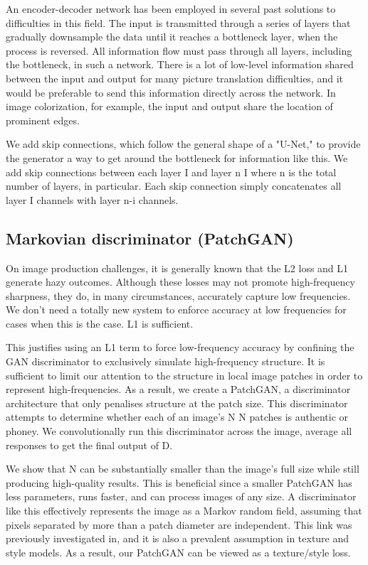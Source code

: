 \par An encoder-decoder network has been employed in several past solutions to difficulties in this field. The input is transmitted through a series of layers that gradually downsample the data until it reaches a bottleneck layer, when the process is reversed. All information flow must pass through all layers, including the bottleneck, in such a network. There is a lot of low-level information shared between the input and output for many picture translation difficulties, and it would be preferable to send this information directly across the network. In image colorization, for example, the input and output share the location of prominent edges.


\par We add skip connections, which follow the general shape of a "U-Net," to provide the generator a way to get around the bottleneck for information like this. We add skip connections between each layer I and layer n I where n is the total number of layers, in particular. Each skip connection simply concatenates all layer I channels with layer n-i channels.

\subsection{Markovian discriminator (PatchGAN)}

On image production challenges, it is generally known that the L2 loss and L1 generate hazy outcomes. Although these losses may not promote high-frequency sharpness, they do, in many circumstances, accurately capture low frequencies. We don't need a totally new system to enforce accuracy at low frequencies for cases when this is the case. L1 is sufficient.

This justifies using an L1 term to force low-frequency accuracy by confining the GAN discriminator to exclusively simulate high-frequency structure. It is sufficient to limit our attention to the structure in local image patches in order to represent high-frequencies. As a result, we create a PatchGAN, a discriminator architecture that only penalises structure at the patch size. This discriminator attempts to determine whether each of an image's N N patches is authentic or phoney. We convolutionally run this discriminator across the image, average all responses to get the final output of D.

We show that N can be substantially smaller than the image's full size while still producing high-quality results. This is beneficial since a smaller PatchGAN has less parameters, runs faster, and can process images of any size.
A discriminator like this effectively represents the image as a Markov random field, assuming that pixels separated by more than a patch diameter are independent. This link was previously investigated in, and it is also a prevalent assumption in texture and style models. As a result, our PatchGAN can be viewed as a texture/style loss.

